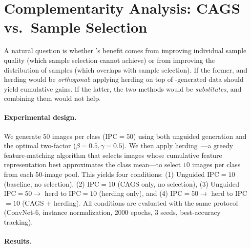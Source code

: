 \section{Complementarity Analysis: CAGS vs.\ Sample Selection}
\label{sec:orthogonality}

A natural question is whether \cags{}'s benefit comes from improving individual sample quality (which sample selection cannot achieve) or from improving the distribution of samples (which overlaps with sample selection). If the former, \cags{} and herding would be \emph{orthogonal}: applying herding on top of \cags{}-generated data should yield cumulative gains. If the latter, the two methods would be \emph{substitutes}, and combining them would not help.

\paragraph{Experimental design.}
We generate $50$ images per class (IPC$=50$) using both unguided generation and the optimal two-factor \cags{} ($\beta{=}0.5, \gamma{=}0.5$). We then apply herding~\cite{welling2012herding}---a greedy feature-matching algorithm that selects images whose cumulative feature representation best approximates the class mean---to select $10$ images per class from each $50$-image pool. This yields four conditions: (1) Unguided IPC$=10$ (baseline, no selection), (2) \cags{} IPC$=10$ (CAGS only, no selection), (3) Unguided IPC$=50 \to$ herd to IPC$=10$ (herding only), and (4) \cags{} IPC$=50 \to$ herd to IPC$=10$ (CAGS $+$ herding). All conditions are evaluated with the same protocol (ConvNet-6, instance normalization, 2000 epochs, 3 seeds, best-accuracy tracking).

\paragraph{Results.}

